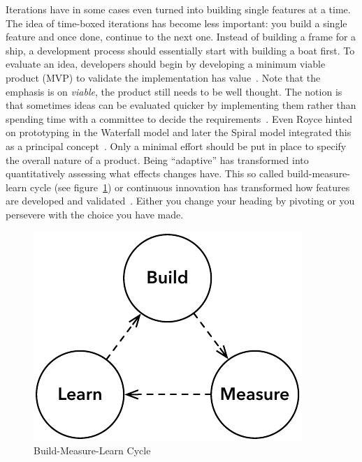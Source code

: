 \documentclass[english]{tktltiki2}
\begin{document}
Iterations have in some cases even turned into building single features at a time. The idea of time-boxed iterations has become less important: you build a single feature and once done, continue to the next one. Instead of building a frame for a ship, a development process should essentially start with building a boat first. To evaluate an idea, developers should begin by developing a minimum viable product (MVP) to validate the implementation has value~\cite{Rie11}. Note that the emphasis is on \emph{viable}, the product still needs to be well thought. The notion is that sometimes ideas can be evaluated quicker by implementing them rather than spending time with a committee to decide the requirements~\cite{Pop02}. Even Royce hinted on prototyping in the Waterfall model and later the Spiral model integrated this as a principal concept~\cite{Roy70, Boe88}. Only a minimal effort should be put in place to specify the overall nature of a product. Being “adaptive” has transformed into quantitatively assessing what effects changes have. This so called build-measure-learn cycle (see figure~\ref{figure:build-measure-learn}) or continuous innovation has transformed how features are developed and validated~\cite{Rie11}. Either you change your heading by pivoting or you persevere with the choice you have made.

\begin{figure}[h!]

    \centering

    \includegraphics[scale = 0.6]{figures/build-measure-learn}

    \caption{Build-Measure-Learn Cycle}
    \label{figure:build-measure-learn}

    \vspace{1cm}

\end{figure}
\end{document}
